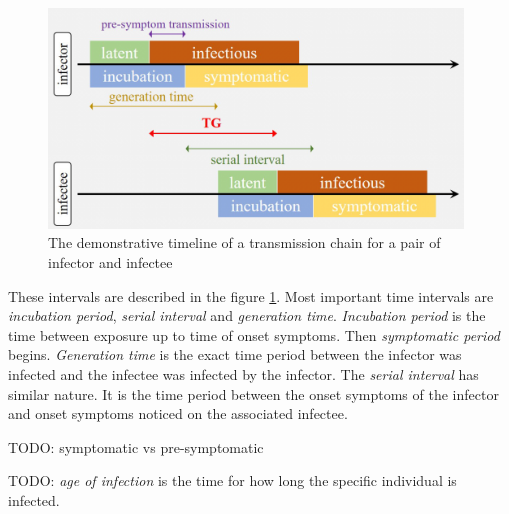 \documentclass[
  digital, %
  oneside, %
  lof,     %
  lot,     %
]{fithesis4}
\begin{document}
\begin{figure}[h]
  \begin{center}
    \includegraphics[width=11cm]{static/images/zhao2020_terms.png}
  \end{center}
  \caption{The demonstrative timeline of a transmission chain for a pair of infector and infectee \cite{zhao2020}}
  \label{fig:zhao-transmissive-chain-example}
\end{figure}

These intervals are described in the figure 
\ref{fig:zhao-transmissive-chain-example}.
Most important time intervals are 
\textit{incubation period}, \textit{serial interval} and \textit{generation time}.
\textit{Incubation period} is the time between exposure up to time of onset 
symptoms. Then \textit{symptomatic period} begins.
\textit{Generation time} is the exact time period between 
the infector was infected and the infectee was infected by the infector.
The \textit{serial interval} has similar nature. It is 
the time period between the onset symptoms of the infector 
and onset symptoms noticed on the associated infectee.






TODO: symptomatic vs pre-symptomatic

TODO: \textit{age of infection} is the time for how long the specific individual is infected.
\end{document}
